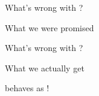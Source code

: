 \documentclass{beamer}
\begin{document}
\begin{frame}{What's wrong with \OLOP?}
\begin{block}{What we were promised}
\begin{center}

\end{center}
\end{block}
\end{frame}

\begin{frame}{What's wrong with \OLOP?}
\begin{alertblock}{What we actually get}
\begin{center}

\end{center}
\end{alertblock}
\begin{flushright}
\OLOP behaves as !
\end{flushright}
\end{frame}

\end{document}
